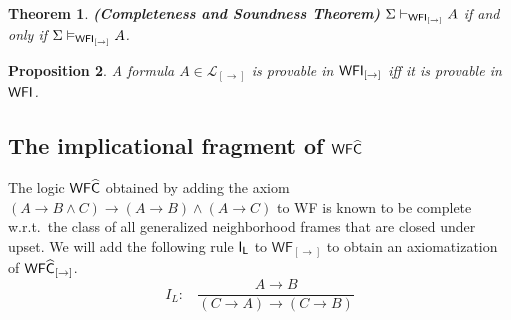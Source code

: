 \documentclass[12pt]{article}
\newtheorem{thm}{Theorem}[section]
\newtheorem{prop}[thm]{Proposition}
\newtheorem{dfn}[thm]{Definition}
\begin{document}




\begin{thm}
\em\textbf{(Completeness and Soundness Theorem)} $ \Sigma\vdash_{{\sf WFI_{[\rightarrow ]}} } A $ if and only if $ \Sigma\vDash_{{\sf WFI_{[\rightarrow ]}} } A $.
\end{thm}

\begin{prop}
A formula $ A \in \mathcal{L}_{[\rightarrow]} $ is provable in ${\sf WFI_{[\rightarrow]}} $ iff it is provable in ${\sf WFI}  $.
\end{prop}

\subsection{The implicational fragment of ${\sf WF}\widehat{{\sf C}}  $}
The logic ${\sf WF}\widehat{{\sf C}}  $ obtained by adding the axiom $(A\rightarrow B\wedge C)\rightarrow (A\rightarrow B)\wedge (A\rightarrow C)$ to {\sf WF} is known to be complete w.r.t.\ the class of all generalized neighborhood frames that are closed under upset. We will add the following rule $ {\sf I_{L}} $ to $\mathsf{WF_{[\rightarrow]}}$  to obtain an axiomatization of ${\sf WF}\widehat{{\sf C}}_{[\rightarrow]} $.
$$ I_{L}:~~~~ \frac{A\rightarrow B}{(C\rightarrow A)\rightarrow (C\rightarrow B)}$$
\end{document}
